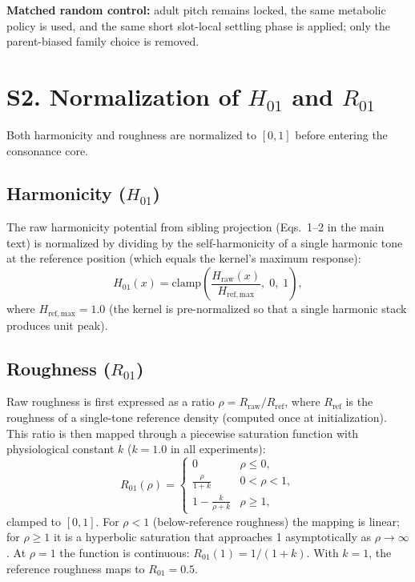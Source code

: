 \documentclass[letterpaper]{article}
\begin{document}
\smallskip
\noindent\textbf{Matched random control:} adult pitch remains locked, the same metabolic policy is used, and the same short slot-local settling phase is applied; only the parent-biased family choice is removed.

\section{S2. Normalization of $H_{01}$ and $R_{01}$}

Both harmonicity and roughness are normalized to $[0,1]$ before entering the consonance core.

\subsection{Harmonicity ($H_{01}$)}

The raw harmonicity potential from sibling projection (Eqs.~1--2 in the main text) is normalized by dividing by the self-harmonicity of a single harmonic tone at the reference position (which equals the kernel's maximum response):
\begin{equation}
H_{01}(x) = \mathrm{clamp}\!\left(\frac{H_{\mathrm{raw}}(x)}{H_{\mathrm{ref,max}}},\;0,\;1\right),
\end{equation}
where $H_{\mathrm{ref,max}} = 1.0$ (the kernel is pre-normalized so that a single harmonic stack produces unit peak).

\subsection{Roughness ($R_{01}$)}

Raw roughness is first expressed as a ratio $\rho = R_{\mathrm{raw}} / R_{\mathrm{ref}}$, where $R_{\mathrm{ref}}$ is the roughness of a single-tone reference density (computed once at initialization). This ratio is then mapped through a piecewise saturation function with physiological constant $k$ ($k\!=\!1.0$ in all experiments):
\begin{equation}
R_{01}(\rho) =
\begin{cases}
0 & \rho \leq 0,\\[2pt]
\displaystyle\frac{\rho}{1+k} & 0 < \rho < 1,\\[6pt]
\displaystyle 1 - \frac{k}{\rho + k} & \rho \geq 1,
\end{cases}
\end{equation}
clamped to $[0,1]$. For $\rho < 1$ (below-reference roughness) the mapping is linear; for $\rho \geq 1$ it is a hyperbolic saturation that approaches 1 asymptotically as $\rho \to \infty$. At $\rho = 1$ the function is continuous: $R_{01}(1) = 1/(1+k)$. With $k=1$, the reference roughness maps to $R_{01} = 0.5$.
\end{document}
